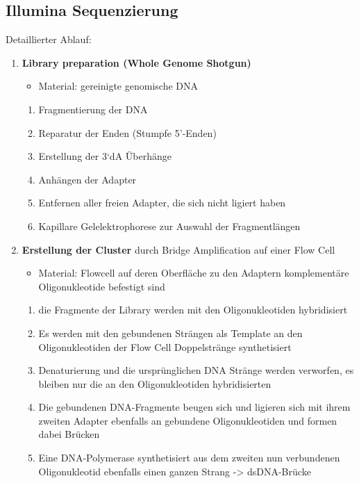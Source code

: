 \subsection{Illumina Sequenzierung}
Detaillierter Ablauf:
\begin{enumerate}
    \item \textbf{Library preparation (Whole Genome Shotgun)}
    \begin{itemize}
        \item Material: gereinigte genomische DNA
    \end{itemize}
    \begin{enumerate}
        \item Fragmentierung der DNA
        \item Reparatur der Enden (Stumpfe 5'-Enden)
        \item Erstellung der 3‘dA Überhänge
        \item Anhängen der Adapter
        \item Entfernen aller freien Adapter, die sich nicht ligiert haben
        \item Kapillare Gelelektrophorese zur Auswahl der Fragmentlängen 
    \end{enumerate}
    \item \textbf{Erstellung der Cluster} durch Bridge Amplification auf einer Flow Cell 
     \begin{itemize}
        \item Material: Flowcell auf deren Oberfläche zu den Adaptern komplementäre Oligonukleotide befestigt sind
    \end{itemize}
    \begin{enumerate}
      \item die Fragmente der Library werden mit den Oligonukleotiden hybridisiert
        \item Es werden mit den gebundenen Strängen als Template an den Oligonukleotiden der Flow Cell Doppelstränge synthetisiert 
        \item Denaturierung und die ursprünglichen DNA Stränge werden verworfen, es bleiben nur die an den Oligonukleotiden hybridisierten 
        \item Die gebundenen DNA-Fragmente beugen sich und ligieren sich mit ihrem zweiten Adapter ebenfalls an gebundene Oligonukleotiden und formen dabei Brücken
        \item Eine DNA-Polymerase synthetisiert aus dem zweiten nun verbundenen Oligonukleotid ebenfalls einen ganzen Strang -> dsDNA-Brücke

\end{enumerate}
\end{enumerate}
